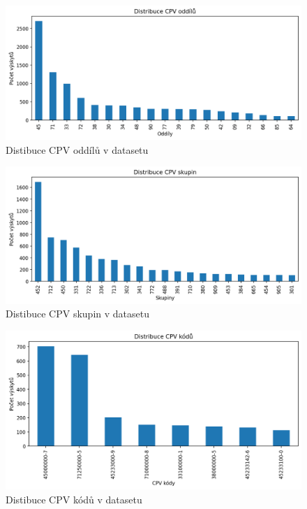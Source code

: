 \documentclass[thesis=M,czech]{FITthesis}[2019/12/23]
\begin{document}
\begin{figure}\centering
	\includegraphics[width=1\textwidth]{images/cpv/dist_cpv_1.png}
	\caption{Distibuce CPV oddílů v datasetu}\label{fig:cpvdist1}
\end{figure}
\begin{figure}\centering
	\includegraphics[width=1\textwidth]{images/cpv/dist_cpv_2.png}
	\caption{Distibuce CPV skupin v datasetu}\label{fig:cpvdist2}
\end{figure}
\begin{figure}\centering
	\includegraphics[width=1\textwidth]{images/cpv/dist_cpv.png}
	\caption{Distibuce CPV kódů v datasetu}\label{fig:cpvdist}
\end{figure}
    
\end{document}
